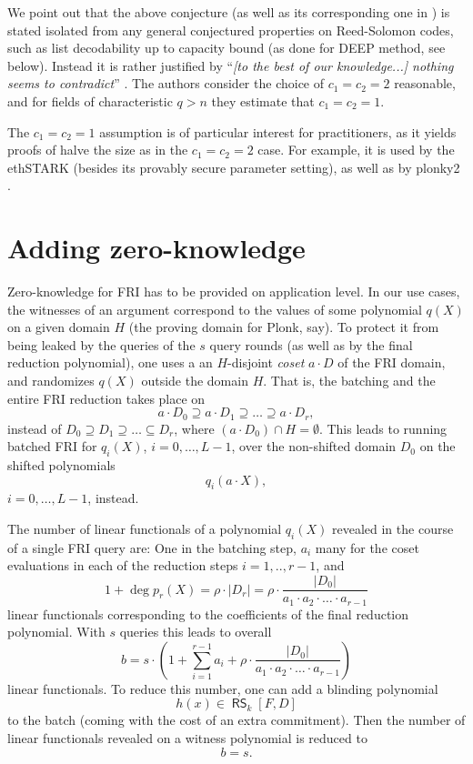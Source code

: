 \documentclass[11pt,article,oneside]{memoir}
\theoremstyle{definition}
\theoremstyle{remark}
\DeclareMathOperator{\RS}{\mathsf{RS}}
\begin{document}
We point out that the above conjecture (as well as its corresponding one in \cite{FRI}) is stated isolated from any general conjectured properties on Reed-Solomon codes, such as list decodability up to capacity bound (as done for DEEP method, see below). 
Instead it is rather justified by “\textit{[to the best of our knowledge...] nothing seems to contradict}” .
The authors consider the choice of $c_1=c_2=2$ reasonable, and for fields of characteristic $q>n$ they estimate that $c_1=c_2=1$. 

The $c_1=c_2=1$ assumption is of particular interest for practitioners, as it yields proofs of halve the size as in the $c_1=c_2=2$ case. For example, it is used by the ethSTARK \cite{ethSTARK} (besides its provably secure parameter setting), as well as by plonky2 \cite{PolygonZero}.


\section{Adding zero-knowledge}

Zero-knowledge for FRI has to be provided on application level. 
In our use cases, the witnesses of an argument correspond to the values of some polynomial $q(X)$ on a given domain $H$ (the proving domain for Plonk, say). 
To protect it from being leaked by the queries of the $s$ query rounds (as well as by the final reduction polynomial), one uses a an $H$-disjoint \textit{coset} $a\cdot D$ of the FRI domain, and randomizes $q(X)$ outside the domain $H$. 
That is, the batching and the entire FRI reduction takes place on 
\[
a\cdot D_0\supseteq a\cdot D_1 \supseteq \ldots \supseteq a\cdot D_{r}, 
\]
instead of $D_0\supseteq D_1 \supseteq \ldots \subseteq D_r$, where $(a\cdot D_0) \cap H=\emptyset$.
This leads to running batched FRI for $q_i(X)$, $i=0,\ldots, L-1$, over the non-shifted domain $D_0$ on the shifted polynomials
\[
q_i(a\cdot X), 
\]
$i=0,\ldots,L-1$, instead.

The number of linear functionals of a polynomial $q_i(X)$ revealed in the course of a single FRI query are:  
One in the batching step, $a_i$ many for the coset evaluations in each of the reduction steps $i=1,..,r-1$, and 
\[
1+ \deg p_r(X) = \rho\cdot |D_r| =  \rho\cdot\frac{ |D_0|}{a_1\cdot a_2\cdot \ldots \cdot a_{r-1}}
\] 
linear functionals corresponding to the coefficients of the final reduction polynomial.
With $s$ queries this leads to overall
\begin{equation}
b=s\cdot (1+ \sum_{i=1}^{r-1} a_i + \rho\cdot \frac{|D_0|}{a_1\cdot a_2\cdot \ldots \cdot a_{r-1}})
\end{equation}
linear functionals. To reduce this number, one can add a blinding polynomial 
\[
h(x) \in \RS_k[F,D] 
\]
to the batch (coming with the cost of an extra commitment). 
Then the number of linear functionals revealed on a witness polynomial is reduced to
\begin{equation}
b= s. 
\end{equation}
\end{document}
